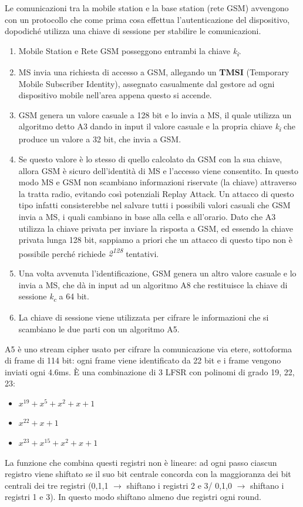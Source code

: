 Le comunicazioni tra la mobile station e la base station (rete GSM) avvengono con un protocollo che come prima cosa effettua l'autenticazione del dispositivo, dopodiché utilizza una chiave di sessione per stabilire le comunicazioni.
\begin{enumerate}
    \item Mobile Station e Rete GSM posseggono entrambi la chiave \textit{k\textsubscript{i}}.
    \item MS invia una richiesta di accesso a GSM, allegando un \textbf{TMSI} (Temporary Mobile Subscriber Identity), assegnato casualmente dal gestore ad ogni dispositivo mobile nell'area appena questo si accende.
    \item GSM genera un valore casuale a 128 bit e lo invia a MS, il quale utilizza un algoritmo detto A3 dando in input il valore casuale e la propria chiave \textit{k\textsubscript{i}} che produce un valore a 32 bit, che invia a GSM. 
    \item Se questo valore è lo stesso di quello calcolato da GSM con la sua chiave, allora GSM è sicuro dell'identità di MS e l'accesso viene consentito. In questo modo MS e GSM non scambiano informazioni riservate (la chiave) attraverso la tratta radio, evitando così potenziali Replay Attack. Un attacco di questo tipo infatti consisterebbe nel salvare tutti i possibili valori casuali che GSM invia a MS, i quali cambiano in base alla cella e all'orario. Dato che A3 utilizza la chiave privata per inviare la risposta a GSM, ed essendo la chiave privata lunga 128 bit, sappiamo a priori che un attacco di questo tipo non è possibile perché richiede \textit{2\textsuperscript{128}} tentativi.
    \item Una volta avvenuta l'identificazione, GSM genera un altro valore casuale e lo invia a MS, che dà in input ad un algoritmo A8 che restituisce la chiave di sessione \textit{k\textsubscript{c}} a 64 bit. 
    \item La chiave di sessione viene utilizzata per cifrare le informazioni che si scambiano le due parti con un algoritmo A5.
\end{enumerate}

A5 è uno stream cipher usato per cifrare la comunicazione via etere, sottoforma di frame di 114 bit: ogni frame viene identificato da 22 bit e i frame vengono inviati ogni 4.6ms. È una combinazione di 3 LFSR con polinomi di grado 19, 22, 23:
\begin{itemize}
    \item $x^{19} + x^{5} + x^{2} + x + 1$
    \item $x^{22} + x + 1$
    \item $x^{23} + x^{15} + x^{2} + x + 1$
\end{itemize}
La funzione che combina questi registri non è lineare: ad ogni passo ciascun registro viene shiftato se il suo bit centrale concorda con la maggioranza dei bit centrali dei tre registri (0,1,1 $\rightarrow$ shiftano i registri 2 e 3/ 0,1,0 $\rightarrow$ shiftano i registri 1 e 3). In questo modo shiftano almeno due registri ogni round. 


